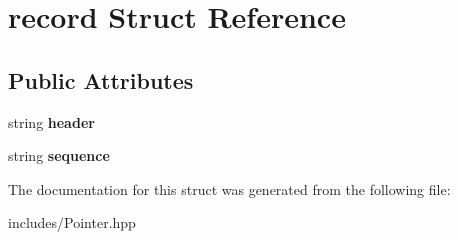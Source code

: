 \hypertarget{structrecord}{}\section{record Struct Reference}
\label{structrecord}
\subsection*{Public Attributes}
\begin{DoxyCompactItemize}
\item 
\mbox{\label{structrecord_a2b62752ce54dab481f622a1a8b35020a}} 
string {\bfseries header}
\item 
\mbox{\label{structrecord_a49d1f7cfef132a9bede7b2708c5c53ba}} 
string {\bfseries sequence}
\end{DoxyCompactItemize}


The documentation for this struct was generated from the following file\+:\begin{DoxyCompactItemize}
\item 
includes/Pointer.\+hpp\end{DoxyCompactItemize}
